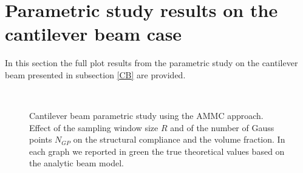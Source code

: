 \section{Parametric study results on the cantilever beam case}
In this section the full plot results from the parametric study on the cantilever beam presented in subsection \ref{CB} are provided.
\begin{figure}
\centering
    \quad
    \\
    \quad
    \caption{Cantilever beam parametric study using the AMMC approach. Effect of the sampling window size $R$ and of the number of Gauss points $N_{GP}$ on the structural compliance and the volume fraction. In each graph we reported in green the true theoretical values based on the analytic beam model.}%
    \label{fig:cbMMC}%
\end{figure}
